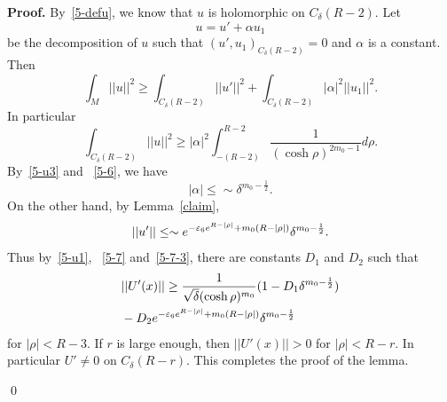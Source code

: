 {\bf Proof.}
By~\eqref{5-defu}, we know that $u$ is holomorphic on $C_\delta(R-2)$. Let
\begin{equation}\label{alpha1}
u=u'+\alpha u_1
\end{equation}
be the decomposition of $u$ such that $(u',u_1)
_{C_\delta(R-2)}=0$ and $\alpha$ is
a constant.
Then
\begin{equation}\label{5-5}
\int_M||u||^2\geq\int_{C_{\delta}(R-2)}
||u'||^2
+\int_{C_{\delta}(R-2)}
|\alpha|^2||u_1||^2.
\end{equation}
In particular
\begin{equation}\label{5-6}
 \int_{C_{\delta}(R-2)}
||u||^2
\geq |\alpha|^2\int^{R-2}_{-(R-2)}\frac{1}{(\cosh\rho)^{2m_0-1}}
d\rho.
\end{equation}
By~\eqref{5-u3} and ~\eqref{5-6}, we have
\begin{equation}\label{5-7}
|\alpha|
\leq\sim \delta^{m_0-\frac 12}.
\end{equation}
On the other hand, by Lemma~\ref{claim},
\begin{equation}\label{5-7-3}
||u'||\leq\sim
e^{-\varepsilon_6e^{R-|\rho|}+m_0(R-|\rho|)}\delta^{m_0-\frac 12}.
\end{equation}
Thus by~\eqref{5-u1}, ~\eqref{5-7} and~\eqref{5-7-3}, there are constants
$D_1$ and $D_2$ such that
\begin{align}\label{5-7-4}
\begin{split}
&||U'(x)||\geq\frac{1}{\sqrt\delta(\cosh\rho)^{m_0}}
(1-D_1\delta^{m_0-\frac 12})\\
&-D_2
e^{-\varepsilon_6e^{R-|\rho|}+m_0(R-|\rho|)}\delta^{m_0-\frac 12}
\end{split}
\end{align}
for $|\rho|<R-3$.
If $r$ is large enough, then $||U'(x)||>0$ for $|\rho|<R-r$.
In particular $U'\neq 0$ on $C_\delta(R-r)$. This completes the proof of
the lemma.

\qed


